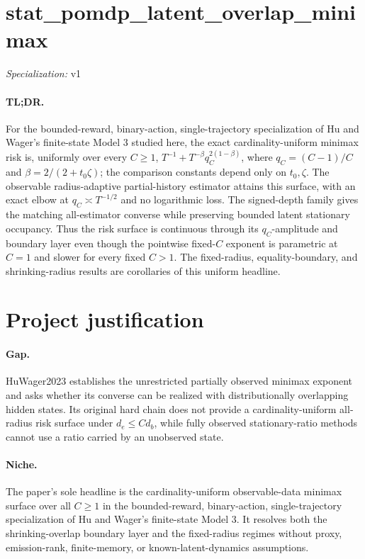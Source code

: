\documentclass{article}
\begin{document}
\sloppy

\section*{stat\_\allowbreak{}pomdp\_\allowbreak{}latent\_\allowbreak{}overlap\_\allowbreak{}minimax}

\noindent\textit{Specialization:} v1\par

\paragraph{TL;DR.} For the bounded-reward, binary-action, single-trajectory specialization of Hu and Wager's finite-state Model 3 studied here, the exact cardinality-uniform minimax risk is, uniformly over every \(C\ge1\), \(T^{-1}+T^{-\beta}q_C^{2(1-\beta)}\), where \(q_C=(C-1)/C\) and \(\beta=2/(2+t_0\zeta)\); the comparison constants depend only on \(t_0,\zeta\). The observable radius-adaptive partial-history estimator attains this surface, with an exact elbow at \(q_C\asymp T^{-1/2}\) and no logarithmic loss. The signed-depth family gives the matching all-estimator converse while preserving bounded latent stationary occupancy. Thus the risk surface is continuous through its \(q_C\)-amplitude and boundary layer even though the pointwise fixed-\(C\) exponent is parametric at \(C=1\) and slower for every fixed \(C>1\). The fixed-radius, equality-boundary, and shrinking-radius results are corollaries of this uniform headline.

\section{Project justification}

\paragraph{Gap.} HuWager2023 establishes the unrestricted partially observed minimax exponent and asks whether its converse can be realized with distributionally overlapping hidden states. Its original hard chain does not provide a cardinality-uniform all-radius risk surface under \(d_e\le Cd_b\), while fully observed stationary-ratio methods cannot use a ratio carried by an unobserved state.

\paragraph{Niche.} The paper's sole headline is the cardinality-uniform observable-data minimax surface over all \(C\ge1\) in the bounded-reward, binary-action, single-trajectory specialization of Hu and Wager's finite-state Model 3. It resolves both the shrinking-overlap boundary layer and the fixed-radius regimes without proxy, emission-rank, finite-memory, or known-latent-dynamics assumptions.
\end{document}
